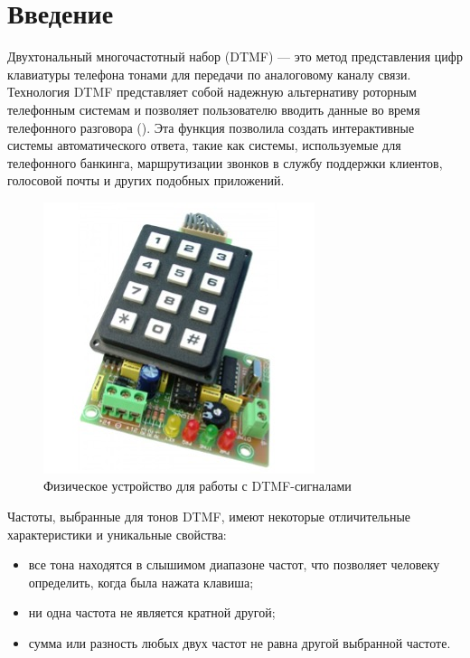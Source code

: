 \chapter*{Введение} %

Двухтональный многочастотный набор (DTMF) — это метод представления цифр клавиатуры телефона тонами для передачи по аналоговому каналу связи. Технология DTMF представляет собой надежную альтернативу роторным телефонным системам и позволяет пользователю вводить данные во время телефонного разговора (). Эта функция позволила создать интерактивные системы автоматического ответа, такие как системы, используемые для телефонного банкинга, маршрутизации звонков в службу поддержки клиентов, голосовой почты и других подобных приложений.

\begin{figure}[ht] 
	\center
	\includegraphics [scale=0.7] {my_folder/images/dtmf}
	\caption{Физическое устройство для работы с DTMF-сигналами} 
	\label{fig:dtmf}
	\end{figure}

Частоты, выбранные для тонов DTMF, имеют некоторые отличительные характеристики и уникальные свойства:

\begin{itemize}
	\item все тона находятся в слышимом диапазоне частот, что позволяет человеку определить, когда была нажата клавиша;
	\item ни одна частота не является кратной другой;
	\item сумма или разность любых двух частот не равна другой выбранной частоте.
\end{itemize} 

